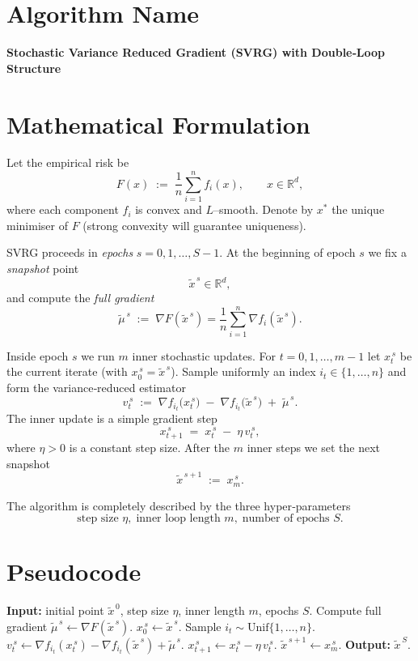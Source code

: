 \documentclass{article}
\newcommand{\R}{\mathbb{R}}
\begin{document}
\section*{Algorithm Name}
\textbf{Stochastic Variance Reduced Gradient (SVRG) with Double‑Loop Structure}

\section*{Mathematical Formulation}
Let the empirical risk be 
\[
F(x)\;:=\;\frac{1}{n}\sum_{i=1}^{n}f_i(x),\qquad x\in\R^{d},
\]
where each component $f_i$ is convex and $L$–smooth.  
Denote by $x^{*}$ the unique minimiser of $F$ (strong convexity will guarantee uniqueness).

SVRG proceeds in \emph{epochs} $s=0,1,\dots,S-1$.  
At the beginning of epoch $s$ we fix a \emph{snapshot} point 
\[
\tilde{x}^{\,s}\in\R^{d},
\]
and compute the \emph{full gradient}
\[
\tilde{\mu}^{\,s}\;:=\;\nabla F(\tilde{x}^{\,s})=\frac{1}{n}\sum_{i=1}^{n}\nabla f_i(\tilde{x}^{\,s}).
\]

Inside epoch $s$ we run $m$ inner stochastic updates.  
For $t=0,1,\dots,m-1$ let $x_{t}^{\,s}$ be the current iterate (with $x_{0}^{\,s}=\tilde{x}^{\,s}$).  
Sample uniformly an index $i_t\in\{1,\dots,n\}$ and form the variance‑reduced estimator
\[
v_{t}^{\,s}\;:=\;\nabla f_{i_t}\!\bigl(x_{t}^{\,s}\bigr)
            \;-\;\nabla f_{i_t}\!\bigl(\tilde{x}^{\,s}\bigr)
            \;+\;\tilde{\mu}^{\,s}.
\tag{1}
\]
The inner update is a simple gradient step
\[
x_{t+1}^{\,s}\;=\;x_{t}^{\,s}\;-\;\eta\,v_{t}^{\,s},
\tag{2}
\]
where $\eta>0$ is a constant step size.  
After the $m$ inner steps we set the next snapshot
\[
\tilde{x}^{\,s+1}\;:=\;x_{m}^{\,s}.
\tag{3}
\]

The algorithm is completely described by the three hyper‑parameters
\[
\boxed{\text{step size }\eta,\;\text{inner loop length }m,\;\text{number of epochs }S.}
\]

\section*{Pseudocode}
\begin{algorithm}[H]
\caption{SVRG}
\begin{algorithmic}[1]
\STATE \textbf{Input:} initial point $\tilde{x}^{\,0}$, step size $\eta$, inner length $m$, epochs $S$.
    \STATE Compute full gradient $\displaystyle\tilde{\mu}^{\,s}\gets\nabla F(\tilde{x}^{\,s})$.
    \STATE $x_{0}^{\,s}\gets\tilde{x}^{\,s}$.
        \STATE Sample $i_t\!\sim\!\text{Unif}\{1,\dots,n\}$.
        \STATE $v_{t}^{\,s}\gets\nabla f_{i_t}(x_{t}^{\,s})-\nabla f_{i_t}(\tilde{x}^{\,s})+\tilde{\mu}^{\,s}$.
        \STATE $x_{t+1}^{\,s}\gets x_{t}^{\,s}-\eta\,v_{t}^{\,s}$.
    \ENDFOR
    \STATE $\tilde{x}^{\,s+1}\gets x_{m}^{\,s}$.
\ENDFOR
\STATE \textbf{Output:} $\tilde{x}^{\,S}$.
\end{algorithmic}
\end{algorithm}
\end{document}
